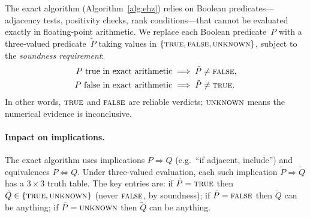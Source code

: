%
%

The exact algorithm (Algorithm~\ref{alg:ehz}) relies on
Boolean predicates---adjacency tests, positivity checks,
rank conditions---that cannot be evaluated exactly in
floating-point arithmetic.
We replace each Boolean predicate~$P$ with a three-valued
predicate~$\tilde P$ taking values in
$\{\textsc{true}, \textsc{false}, \textsc{unknown}\}$,
subject to the \emph{soundness requirement}:
\begin{align*}
  P \text{ true in exact arithmetic}
  &\;\Longrightarrow\;
  \tilde P \neq \textsc{false}, \\
  P \text{ false in exact arithmetic}
  &\;\Longrightarrow\;
  \tilde P \neq \textsc{true}.
\end{align*}
In other words, $\textsc{true}$ and $\textsc{false}$ are
reliable verdicts; $\textsc{unknown}$ means the numerical
evidence is inconclusive.

\paragraph{Impact on implications.}
The exact algorithm uses implications
$P \Rightarrow Q$ (e.g.\ ``if adjacent, include'') and
equivalences $P \Leftrightarrow Q$.
Under three-valued evaluation, each such implication
$\tilde P \Rightarrow \tilde Q$ has a $3 \times 3$ truth
table.
The key entries are:
if $\tilde P = \textsc{true}$ then
$\tilde Q \in \{\textsc{true}, \textsc{unknown}\}$
(never $\textsc{false}$, by soundness);
if $\tilde P = \textsc{false}$ then $\tilde Q$ can be anything;
if $\tilde P = \textsc{unknown}$ then $\tilde Q$ can be anything.


